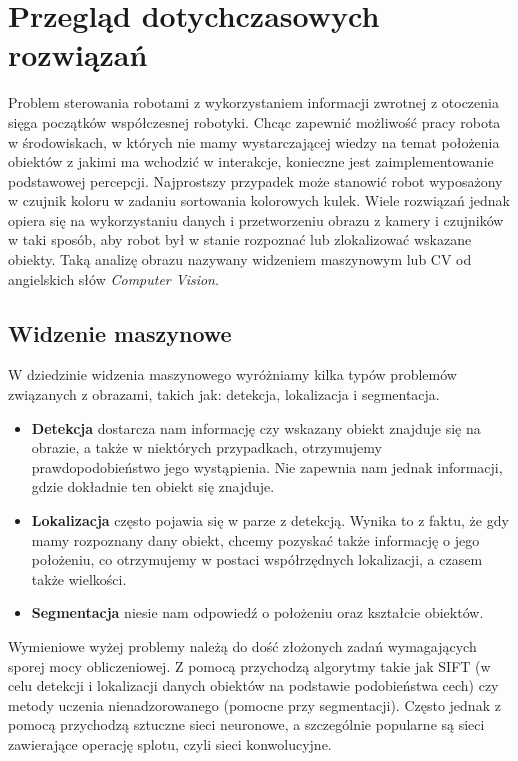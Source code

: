 \documentclass[12pt]{article}
\begin{document}
\newpage
\section{Przegląd dotychczasowych rozwiązań}
Problem sterowania robotami z wykorzystaniem informacji zwrotnej z otoczenia sięga początków współczesnej robotyki. Chcąc zapewnić możliwość pracy robota w środowiskach, w których nie mamy wystarczającej wiedzy na temat położenia obiektów z jakimi ma wchodzić w interakcje, konieczne jest zaimplementowanie podstawowej percepcji. Najprostszy przypadek może stanowić robot wyposażony w czujnik koloru w zadaniu sortowania kolorowych kulek. Wiele rozwiązań jednak opiera się na wykorzystaniu danych i przetworzeniu obrazu z kamery i czujników w taki sposób, aby robot był w stanie rozpoznać lub zlokalizować wskazane obiekty. Taką analizę obrazu nazywany widzeniem maszynowym lub CV od angielskich słów \emph{Computer Vision}.

\subsection{Widzenie maszynowe}
W dziedzinie widzenia maszynowego wyróżniamy kilka typów problemów związanych z obrazami, takich jak: detekcja, lokalizacja i segmentacja.

\begin{itemize}
\item \textbf{Detekcja} dostarcza nam informację czy wskazany obiekt znajduje się na obrazie,
a także w niektórych przypadkach, otrzymujemy prawdopodobieństwo jego wystąpienia. Nie zapewnia nam jednak informacji, gdzie dokładnie ten obiekt się znajduje.
\item \textbf{Lokalizacja} często pojawia się w parze z detekcją. Wynika to z faktu, że gdy mamy rozpoznany dany obiekt, chcemy pozyskać także informację o jego położeniu, co otrzymujemy w postaci współrzędnych lokalizacji, a czasem także wielkości.
\item \textbf{Segmentacja} niesie nam odpowiedź o położeniu oraz kształcie obiektów.
\end{itemize} 

Wymieniowe wyżej problemy należą do dość złożonych zadań wymagających sporej mocy obliczeniowej. Z pomocą przychodzą algorytmy takie jak SIFT (w celu detekcji i lokalizacji danych obiektów na podstawie podobieństwa cech) czy metody uczenia nienadzorowanego (pomocne przy segmentacji). Często jednak z pomocą przychodzą sztuczne sieci neuronowe, a szczególnie popularne są sieci zawierające operację splotu, czyli sieci konwolucyjne.
\end{document}
